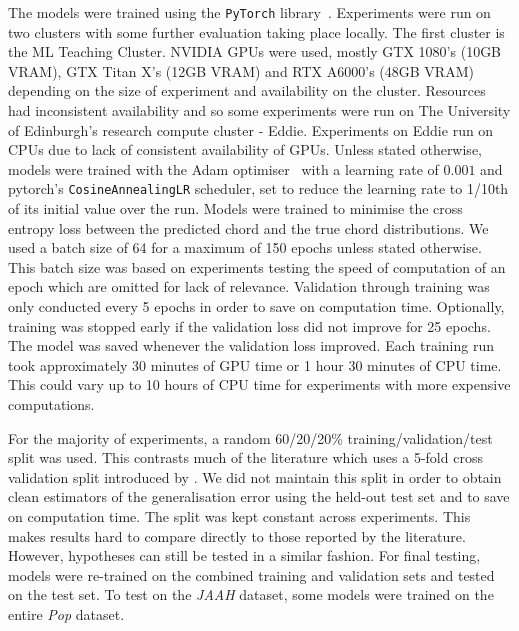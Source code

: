 The models were trained using the \texttt{PyTorch} library~\citep{pytorch}. Experiments were run on two clusters with some further evaluation taking place locally. The first cluster is the ML Teaching Cluster. NVIDIA GPUs were used, mostly GTX 1080's (10GB VRAM), GTX Titan X's (12GB VRAM) and RTX A6000's (48GB VRAM) depending on the size of experiment and availability on the cluster. Resources had inconsistent availability and so some experiments were run on The University of Edinburgh's research compute cluster - Eddie. Experiments on Eddie run on CPUs due to lack of consistent availability of GPUs. Unless stated otherwise, models were trained with the Adam optimiser~\citep{adam} with a learning rate of $0.001$ and pytorch's \texttt{CosineAnnealingLR} scheduler, set to reduce the learning rate to 1/10th of its initial value over the run. Models were trained to minimise the cross entropy loss between the predicted chord and the true chord distributions. We used a batch size of 64 for a maximum of 150 epochs unless stated otherwise. This batch size was based on experiments testing the speed of computation of an epoch which are omitted for lack of relevance. Validation through training was only conducted every 5 epochs in order to save on computation time. Optionally, training was stopped early if the validation loss did not improve for 25 epochs. The model was saved whenever the validation loss improved. Each training run took approximately 30 minutes of GPU time or 1 hour 30 minutes of CPU time. This could vary up to 10 hours of CPU time for experiments with more expensive computations.

For the majority of experiments, a random 60/20/20\% training/validation/test split was used. This contrasts much of the literature which uses a 5-fold cross validation split introduced by \citet{FourTimelyInsights}. We did not maintain this split in order to obtain clean estimators of the generalisation error using the held-out test set and to save on computation time. The split was kept constant across experiments. This makes results hard to compare directly to those reported by the literature. However, hypotheses can still be tested in a similar fashion. For final testing, models were re-trained on the combined training and validation sets and tested on the test set. To test on the \emph{JAAH} dataset, some models were trained on the entire \emph{Pop} dataset.